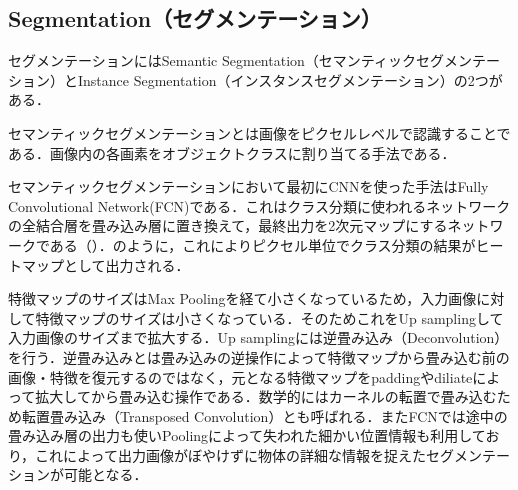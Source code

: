\subsection{Segmentation（セグメンテーション）}
セグメンテーションにはSemantic Segmentation（セマンティックセグメンテーション）とInstance Segmentation（インスタンスセグメンテーション）の2つがある．

セマンティックセグメンテーションとは画像をピクセルレベルで認識することである．画像内の各画素をオブジェクトクラスに割り当てる手法である．

セマンティックセグメンテーションにおいて最初にCNNを使った手法はFully Convolutional Network(FCN)である\cite{FCN}．これはクラス分類に使われるネットワークの全結合層を畳み込み層に置き換えて，最終出力を2次元マップにするネットワークである（）．のように，これによりピクセル単位でクラス分類の結果がヒートマップとして出力される．

特徴マップのサイズはMax Poolingを経て小さくなっているため，入力画像に対して特徴マップのサイズは小さくなっている．そのためこれをUp samplingして入力画像のサイズまで拡大する．Up samplingには逆畳み込み（Deconvolution）を行う．逆畳み込みとは畳み込みの逆操作によって特徴マップから畳み込む前の画像・特徴を復元するのではなく，元となる特徴マップをpaddingやdiliateによって拡大してから畳み込む操作である．数学的にはカーネルの転置で畳み込むため転置畳み込み（Transposed Convolution）とも呼ばれる．またFCNでは途中の畳み込み層の出力も使いPoolingによって失われた細かい位置情報も利用しており，これによって出力画像がぼやけずに物体の詳細な情報を捉えたセグメンテーションが可能となる．

